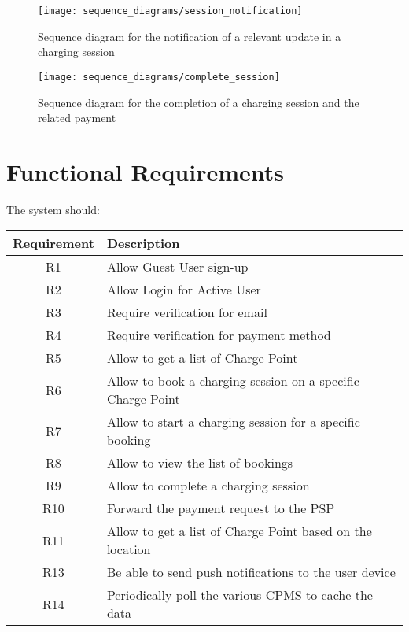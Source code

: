 \begin{figure}[h]
\centering
\texttt{[image: sequence\_diagrams/session\_notification]}
\caption{Sequence diagram for the notification of a relevant update in a charging session}
\end{figure}


\begin{figure}[h]
\centering
\texttt{[image: sequence\_diagrams/complete\_session]}
\caption{Sequence diagram for the completion of a charging session and the related payment}
\end{figure}

\clearpage
\newpage


\section{Functional Requirements}

The system should:\\

\begin{tabular}{|c|l|}
	\hline
	\bf{Requirement} & \bf{Description} \\
	\hline
	R1 & Allow Guest User sign-up\\
	\hline
	R2 & Allow Login for Active User\\
	\hline
	R3 & Require verification for email\\
	\hline
	R4 & Require verification for payment method\\
	\hline
	R5 & Allow to get a list of Charge Point\\
	\hline
	R6 & Allow to book a charging session on a specific Charge Point\\
	\hline
	R7 & Allow to start a charging session for a specific booking\\
	\hline
	R8 & Allow to view the list of bookings\\
	\hline
	R9 & Allow to complete a charging session\\
	\hline
	R10 & Forward the payment request to the PSP\\
	\hline
	R11 & Allow to get a list of Charge Point based on the location\\
	\hline
	R13 & Be able to send push notifications to the user device\\
	\hline
	R14 & Periodically poll the various CPMS to cache the data\\
	
	\hline
\end{tabular}

